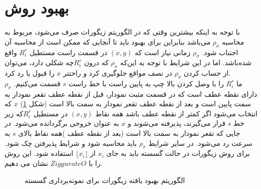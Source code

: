    \section{بهبود روش }   
با توجه به اینکه بیشترین وقتی که در الگوریتم زیگورات صرف می‌شود، مربوط به محاسبه $\rho _{\sigma}$ می‌باشد بنابراین برای بهبود باید تا آنجایی که ممکن است از محاسبه آن اجتناب شود. $\rho _{\sigma}$ زمانی نیاز است که $(x,y)$ در قسمت راست مستطیل $R^{r} _{i}$ واقع شده‌باشد. اما در این شرایط با توجه به این‌که $\rho _{\sigma}$  که درون $R^{r} _{i}$چه شکلی دارد، می‌توان از حساب کردن $\rho _{\sigma}$ در نصف مواقع جلوگیری کرد و راحتتر $x$ را قبول یا رد کرد.
\\
ما $R^{r} _{i}$ را با وصل کردن بالا چپ به پایین راست با خط راست $s$ قسمت می‌کنیم. $\rho _{\sigma}$   دارای نقطه عطف است که در قسمت مثبت نمودار، قبل از نقطه عطف تقعر نمودار به سمت پایین است و بعد از نقطه عطف تقعر نمودار به سمت بالا است (شکل  \ref{ZiggurateO})   $x$ که انتخاب می‌شود اگر کمتر از نقطه عطف باشد همه نقاط $(x,y)$ در مستطیل $R^{r} _{i}$که زیر خط $s$ قرار می‌گیرند، پذیرفته می‌شوند و $x$ به عنوان خروجی برگردانده می‌شود. در جایی که تقعر نمودار به سمت بالا است (بعد از نقطه عطف )همه نقاط بالای $s$ به سرعت رد می‌شود. در سایر شرایط $\rho _{\sigma}$ باید محاسبه شود و شرایط پذیرفتن چک شود. برای روش زیگورات در حالت گسسته باید به جای $x_{i}$ از $\lfloor x_{i}\rfloor $ استفاده شود. این روش را با $ZiggurateO$  نشان می دهیم\cite{510}.
    \begin{figure}[!htb]
      	
      	\caption{الگوریتم  بهبود یافته زیگورات برای نمونه‌برداری گسسته\cite{510}}

		\label{ZiggurateO}
      \end{figure}
      

